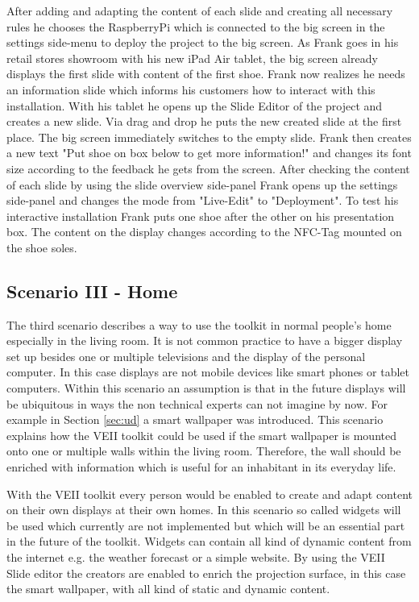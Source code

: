 {After adding and adapting the content of each slide and creating all necessary rules he chooses the RaspberryPi which is connected to the big screen in the settings side-menu to deploy the project to the big screen. As Frank goes in his retail stores showroom with his new iPad Air tablet, the big screen already displays the first slide with content of the first shoe. Frank now realizes he needs an information slide which informs his customers how to interact with this installation. With his tablet he opens up the Slide Editor of the project and creates a new slide. Via drag and drop he puts the new created slide at the first place. The big screen immediately switches to the empty slide. Frank then creates a new text "Put shoe on box below to get more information!" and changes its font size according to the feedback he gets from the screen. After checking the content of each slide by using the slide overview side-panel Frank opens up the settings side-panel and changes the mode from "Live-Edit" to "Deployment". To test his interactive installation Frank puts one shoe after the other on his presentation box. The content on the display changes according to the NFC-Tag mounted on the shoe soles.
}


\subsection{Scenario III - Home}
The third scenario describes a way to use the toolkit in normal people's home especially in the living room. It is not common practice to have a bigger display set up besides one or multiple televisions and the display of the personal computer. In this case displays are not mobile devices like smart phones or tablet computers. Within this scenario an assumption is that in the future displays will be ubiquitous in ways the non technical experts can not imagine by now. For example in Section \ref{sec:ud} a smart wallpaper was introduced. This scenario explains how the VEII toolkit could be used if the smart wallpaper is mounted onto one or multiple walls within the living room. Therefore, the wall should be enriched with information which is useful for an inhabitant in its everyday life. 

With the VEII toolkit every person would be enabled to create and adapt content on their own displays at their own homes. In this scenario so called widgets will be used which currently are not implemented but which will be an essential part in the future of the toolkit. Widgets can contain all kind of dynamic content from the internet e.g. the weather forecast or a simple website. By using the VEII Slide editor the creators are enabled to enrich the projection surface, in this case the smart wallpaper, with all kind of static and dynamic content.

